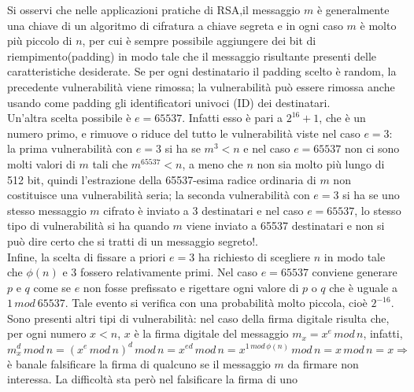 Si osservi che nelle applicazioni pratiche di RSA,il messaggio $m$ è generalmente una chiave di un algoritmo di cifratura a chiave segreta e in ogni caso $m$ è molto più piccolo di $n$, per cui è sempre possibile aggiungere dei bit di riempimento(padding) in modo tale che il messaggio risultante presenti delle caratteristiche desiderate. Se per ogni destinatario il padding scelto è random, la precedente vulnerabilità viene rimossa; la vulnerabilità può essere rimossa anche usando come padding gli identificatori univoci (ID) dei
destinatari. \\
Un'altra scelta possibile è $e=65537$. Infatti esso è pari a $2^{16}+1$, che è un numero primo, e rimuove o riduce del tutto le vulnerabilità viste nel caso $e=3$: la prima vulnerabilità con $e=3$ si ha se $m^3<n$ e nel caso $e=65537$ non ci sono molti valori di $m$ tali che $m^{65537} < n$, a meno che $n$ non sia molto più lungo di 512 bit, quindi l'estrazione della 65537-esima radice ordinaria di $m$ non costituisce una vulnerabilità seria; la seconda vulnerabilità con $e=3$ si ha se uno stesso messaggio $m$ cifrato è inviato a 3 destinatari e nel caso $e=65537$, lo stesso tipo di vulnerabilità si ha quando $m$ viene inviato a 65537 destinatari e non si può dire certo che si tratti di un messaggio segreto!. \\ Infine, la scelta di fissare a priori $e=3$ ha richiesto di scegliere $n$ in modo tale che $\phi(n)$ e 3 fossero relativamente primi. Nel caso $e=65537$ conviene generare $p$ e $q$ come se $e$ non fosse prefissato e rigettare ogni valore di $p$ o $q$ che è uguale a $1 \, mod \: 65537$. Tale evento si verifica con una probabilità molto piccola, cioè $2^{-16}$.\\
Sono presenti altri tipi di vulnerabilità: nel caso della firma digitale risulta che, per ogni numero $x < n$, $x$ è la firma digitale del messaggio $m_{x} = x^e \,  mod \, n$, infatti, $m_{x}^d \, mod \, n = (x^e \, mod \, n)^d \, mod \, n = x^{ed} \, mod \, n = x^{1 \, mod \, \phi(n)} \, mod \, n = x \, mod \, n = x \Rightarrow$ è banale falsificare la firma di qualcuno se il messaggio $m$ da firmare non interessa. La difficoltà sta però nel falsificare la firma di uno
